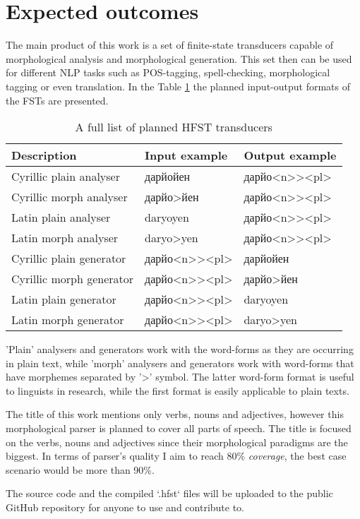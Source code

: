 \section{Expected outcomes}
\par The main product of this work is a set of finite-state transducers capable of morphological analysis and morphological generation. This set then can be used for different NLP tasks such as POS-tagging, spell-checking, morphological tagging or even translation. In the Table \hyperref[Tab:format]{1} the planned input-output formats of the FSTs are presented.
\begin{table}[!h]
    \begin{center}
        \begin{tabular}{|l|l|l|} 
            \hline
            Description & Input example & Output example \\
            \hline
            \hline
            Cyrillic plain analyser & дарйойен & дарйо<n>{}><pl> \\
            \hline
            Cyrillic morph analyser & дарйо>йен & дарйо<n>{}><pl> \\
            \hline
            Latin plain analyser & daryoyen & дарйо<n>{}><pl> \\
            \hline
            Latin morph analyser & daryo>yen & дарйо<n>{}><pl> \\
            \hline
            Cyrillic plain generator & дарйо<n>{}><pl> & дарйойен \\
            \hline
            Cyrillic morph generator & дарйо<n>{}><pl> & дарйо>йен \\
            \hline
            Latin plain generator & дарйо<n>{}><pl> & daryoyen \\
            \hline
            Latin morph generator & дарйо<n>{}><pl> & daryo>yen \\
            \hline
        \end{tabular}
        \label{Tab:format}
        \caption{A full list of planned HFST transducers}
    \end{center}
\end{table}
'Plain' analysers and generators work with the word-forms as they are occurring in plain text, while 'morph' analysers and generators work with word-forms that have morphemes separated by '>' symbol. The latter word-form format is useful to linguists in research, while the first format is easily applicable to plain texts.
\par The title of this work mentions only verbs, nouns and adjectives, however this morphological parser is planned to cover all parts of speech. The title is focused on the verbs, nouns and adjectives since their morphological paradigms are the biggest. In terms of parser's quality I aim to reach 80\% \textit{coverage}, the best case scenario would be more than 90\%. 
\par The source code and the compiled `.hfst` files will be uploaded to the public GitHub repository for anyone to use and contribute to.